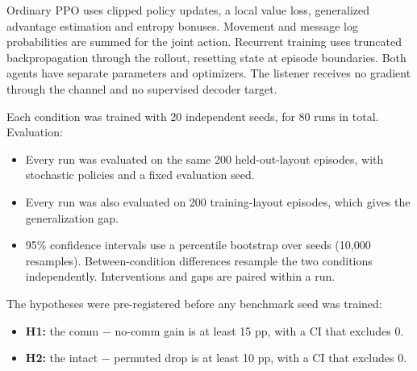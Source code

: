 Ordinary PPO uses clipped policy updates, a local value loss,
generalized advantage estimation and entropy bonuses. Movement and
message log probabilities are summed for the joint action. Recurrent
training uses truncated backpropagation through the rollout, resetting
state at episode boundaries. Both agents have separate parameters and
optimizers. The listener receives no gradient through the channel and no
supervised decoder target.

\begin{center}
\small
{}
\end{center}

Each condition was trained with 20 independent seeds, for 80 runs in
total. Evaluation:

\begin{itemize}
\tightlist
\item
  Every run was evaluated on the same 200 held-out-layout episodes, with
  stochastic policies and a fixed evaluation seed.
\item
  Every run was also evaluated on 200 training-layout episodes, which
  gives the generalization gap.
\item
  95\% confidence intervals use a percentile bootstrap over seeds
  (10,000 resamples). Between-condition differences resample the two
  conditions independently. Interventions and gaps are paired within a
  run.
\end{itemize}

The hypotheses were pre-registered before any benchmark seed was
trained:

\begin{itemize}
\tightlist
\item
  \textbf{H1:} the comm − no-comm gain is at least 15 pp, with a CI that
  excludes 0.
\item
  \textbf{H2:} the intact − permuted drop is at least 10 pp, with a CI
  that excludes 0.
\end{itemize}

